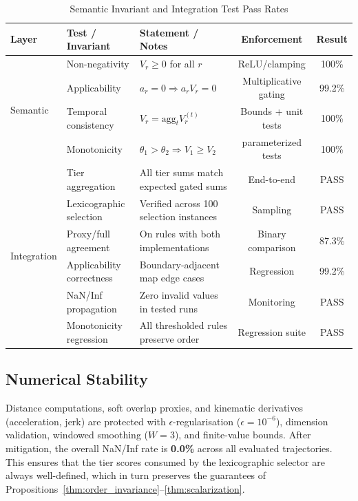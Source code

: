 \begin{table}
\centering
\caption{Semantic Invariant and Integration Test Pass Rates}
\label{tab:semantic_invariants}
\small
\begin{tabular}{lllcc}
\toprule
\textbf{Layer} & \textbf{Test / Invariant} & \textbf{Statement / Notes} & \textbf{Enforcement} & \textbf{Result} \\
\midrule
\multirow{4}{*}{Semantic}
& Non-negativity & $V_r \geq 0$ for all $r$ & ReLU/clamping & 100\% \\
& Applicability & $a_r{=}0 \Rightarrow a_r V_r{=}0$ & Multiplicative gating & 99.2\% \\
& Temporal consistency & $V_r=\mathrm{agg}_t V_r^{(t)}$ & Bounds + unit tests & 100\% \\
& Monotonicity & $\theta_1{>}\theta_2 \Rightarrow V_1{\geq} V_2$ & parameterized tests & 100\% \\
\midrule
\multirow{6}{*}{Integration}
& Tier aggregation & All tier sums match expected gated sums & End-to-end & PASS \\
& Lexicographic selection & Verified across 100 selection instances & Sampling & PASS \\
& Proxy/full agreement & On rules with both implementations & Binary comparison & 87.3\% \\
& Applicability correctness & Boundary-adjacent map edge cases & Regression & 99.2\% \\
& NaN/Inf propagation & Zero invalid values in tested runs & Monitoring & PASS \\
& Monotonicity regression & All thresholded rules preserve order & Regression suite & PASS \\
\bottomrule
\end{tabular}
\end{table}

\subsection{Numerical Stability}
\label{subsec:numerical_stability}

Distance computations, soft overlap proxies, and kinematic derivatives (acceleration, jerk) are protected with $\epsilon$-regularisation ($\epsilon{=}10^{-6}$), dimension validation, windowed smoothing ($W{=}3$), and finite-value bounds.  After mitigation, the overall NaN/Inf rate is \textbf{0.0\%} across all evaluated trajectories.  This ensures that the tier scores consumed by the lexicographic selector are always well-defined, which in turn preserves the guarantees of Propositions~\ref{thm:order_invariance}--\ref{thm:scalarization}.

